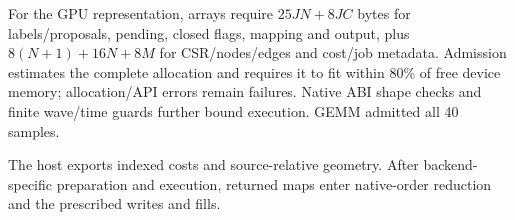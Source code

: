 For the GPU representation, arrays require $25JN+8JC$ bytes for labels/proposals, pending, closed flags, mapping and output, plus $8(N+1)+16N+8M$ for CSR/nodes/edges and cost/job metadata. Admission estimates the complete allocation and requires it to fit within 80\% of free device memory; allocation/API errors remain failures. Native ABI shape checks and finite wave/time guards further bound execution. GEMM admitted all 40 samples.

The host exports indexed costs and source-relative geometry. After backend-specific preparation and execution, returned maps enter native-order reduction and the prescribed writes and fills.
